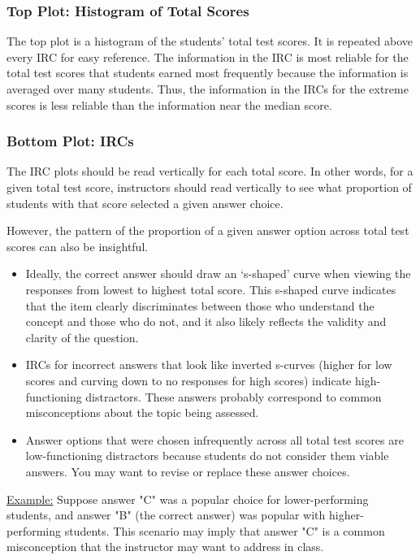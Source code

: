 \documentclass[11pt,letterpaper]{article}\usepackage[]{graphicx}\usepackage[]{color}
\begin{document}
\subsubsection*{Top Plot: Histogram of Total Scores}
The top plot is a histogram of the students' total test scores. It is repeated above every IRC for easy reference.  The information in the IRC is most reliable for the total test scores that students earned most frequently because the information is averaged over many students.  Thus, the information in the IRCs for the extreme scores is less reliable than the information near the median score.

\subsubsection*{Bottom Plot: IRCs}
The IRC plots should be read vertically for each total score.  In other words, for a given total test score, instructors should read vertically to see what proportion of students with that score selected a given answer choice.

However, the pattern of the proportion of a given answer option across total test scores can also be insightful.  
\begin{itemize}
	\item Ideally, the correct answer should draw an `s-shaped' curve when viewing the responses from lowest to highest total score.  This s-shaped curve indicates that the item clearly discriminates between those who understand the concept and those who do not, and it also likely reflects the validity and clarity of the question.
	\item IRCs for incorrect answers that look like inverted s-curves (higher for low scores and curving down to no responses for high scores) indicate high-functioning distractors.  These answers probably correspond to common misconceptions about the topic being assessed.
	\item Answer options that were chosen infrequently across all total test scores are low-functioning distractors because students do not consider them viable answers. You may want to revise or replace these answer choices.
\end{itemize}

\noindent \underline{Example:}  Suppose answer "C" was a popular choice for lower-performing students, and answer "B" (the correct answer) was popular with higher-performing students.  This scenario may imply that answer "C" is a common misconception that the instructor may want to address in class.
\end{document}
